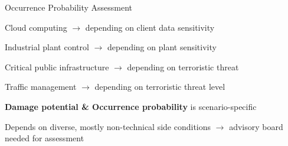 \documentclass[a4paper]{article}
\renewcommand{\note}[2]{\begin{noteBox} \textbf{#1} #2 \end{noteBox}}
\begin{document}
\begin{multicols}{3}
    Occurrence Probability Assessment
    \begin{itemize*}
        \item Cloud computing $\rightarrow$ depending on client data sensitivity
        \item Industrial plant control $\rightarrow$ depending on plant sensitivity
        \item Critical public infrastructure $\rightarrow$ depending on terroristic threat
        \item Traffic management $\rightarrow$ depending on terroristic threat level
    \end{itemize*}

    \note{Damage potential \& Occurrence probability}{is scenario-specific}

    Depends on diverse, mostly non-technical side conditions $\rightarrow$ advisory board needed for assessment


\end{multicols}
\end{document}
